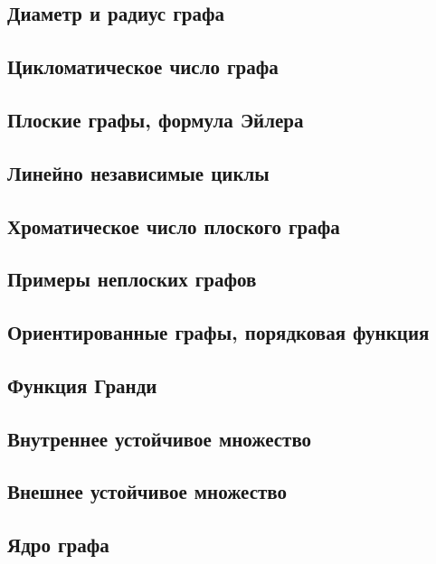 \documentclass[a4paper, 12pt]{extarticle}
\begin{document}













\subsection{Диаметр и радиус графа}

\subsection{Цикломатическое число графа}
\subsection{Плоские графы, формула Эйлера}
\subsection{Линейно независимые циклы}
\subsection{Хроматическое число плоского графа}
\subsection{Примеры неплоских графов}
\subsection{Ориентированные графы, порядковая функция}
\subsection{Функция Гранди}
\subsection{Внутреннее устойчивое множество}
\subsection{Внешнее устойчивое множество}
\subsection{Ядро графа}
\end{document}
